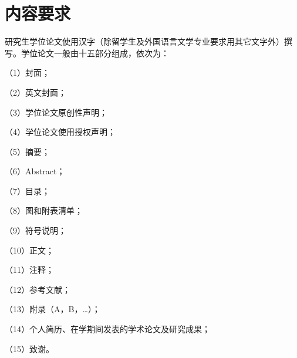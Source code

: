 \chapter{内容要求}
\label{cha:overview}

研究生学位论文使用汉字（除留学生及外国语言文学专业要求用其它文字外）撰写。学位论文一般由十五部分组成，依次为：

（1）封面；

（2）英文封面；

（3）学位论文原创性声明；

（4）学位论文使用授权声明；

（5）摘要；

（6）Abstract；

（7）目录；

（8）图和附表清单；

（9）符号说明；

（10）正文；

（11）注释；

（12）参考文献；

（13）附录（A，B，…）；

（14）个人简历、在学期间发表的学术论文及研究成果；

（15）致谢。

